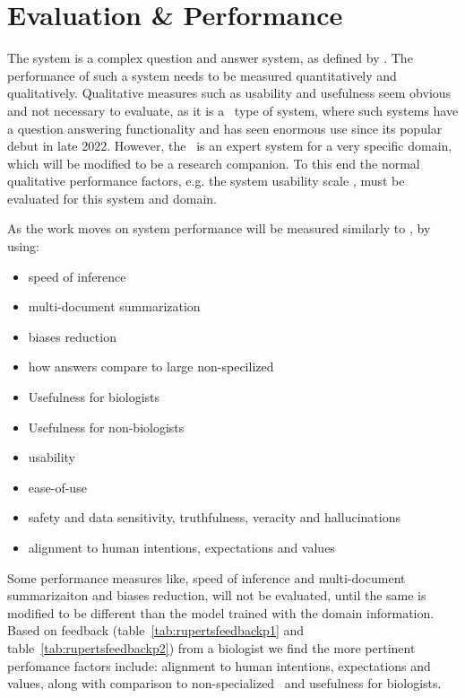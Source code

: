 \section{Evaluation \& Performance}

The system is a complex question and answer system, as defined by \cite{Daull:2023:complex}.
The performance of such a system needs to be measured quantitatively and qualitatively.
Qualitative measures such as usability and usefulness seem obvious and not necessary to evaluate, as it is a \gpts\ type of system, where such systems have a question answering functionality and has seen enormous use since its popular debut in late 2022.
However, the \project\ is an expert system for a very specific domain, which will be modified to be a research companion.
To this end the normal qualitative performance factors, e.g. the system usability scale \cite{Blattgerste:2022},  must be evaluated for this system and domain.


As the work moves on system performance will be measured similarly to \cite{Daull:2023:complex}, by using:
\begin{itemize}
    \item speed of inference
    \item multi-document summarization
    \item biases reduction
    \item how answers compare to large non-specilized \llms\
    \item Usefulness for biologists
    \item Usefulness for non-biologists
    \item usability
    \item ease-of-use
    \item safety and data sensitivity, truthfulness, veracity and hallucinations
    \item alignment to human intentions, expectations and values
\end{itemize}

Some performance measures like, speed of inference and multi-document summarizaiton and biases reduction, will not be evaluated, until the same is modified to be different than the model trained with the domain information.
Based on feedback (table~\ref{tab:rupertsfeedbackp1} and table~\ref{tab:rupertsfeedbackp2}) from a biologist we find the more pertinent perfomance factors include: alignment to human intentions, expectations and values, along with comparison to non-specialized \llms\, and usefulness for biologists.

